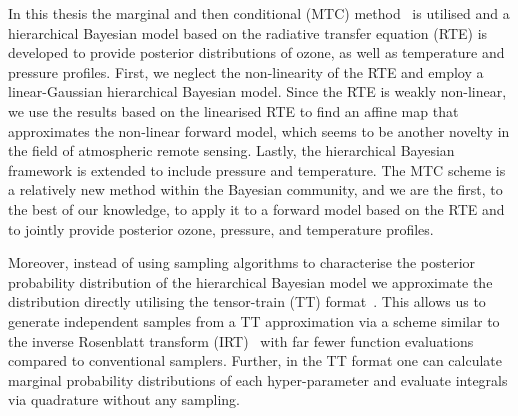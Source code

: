 In this thesis the marginal and then conditional (MTC) method~\cite{fox2016fast} is utilised and a hierarchical Bayesian model based on the radiative transfer equation (RTE) is developed to provide posterior distributions of ozone, as well as temperature and pressure profiles.
First, we neglect the non-linearity of the RTE and employ a linear-Gaussian hierarchical Bayesian model.
Since the RTE is weakly non-linear, we use the results based on the linearised RTE to find an affine map that approximates the non-linear forward model, which seems to be another novelty in the field of atmospheric remote sensing.
Lastly, the hierarchical Bayesian framework is extended to include pressure and temperature.
The MTC scheme is a relatively new method within the Bayesian community, and we are the first, to the best of our knowledge, to apply it to a forward model based on the RTE and to jointly provide posterior ozone, pressure, and temperature profiles.

Moreover, instead of using sampling algorithms to characterise the posterior probability distribution of the hierarchical Bayesian model we approximate the distribution directly utilising the tensor-train (TT) format~\cite{cui2022deep}. 
This allows us to generate independent samples from a TT approximation via a scheme similar to the inverse Rosenblatt transform (IRT)~\cite{dolgov2020approximation} with far fewer function evaluations compared to conventional samplers.
Further, in the TT format one can calculate marginal probability distributions of each hyper-parameter and evaluate integrals via quadrature without any sampling.


